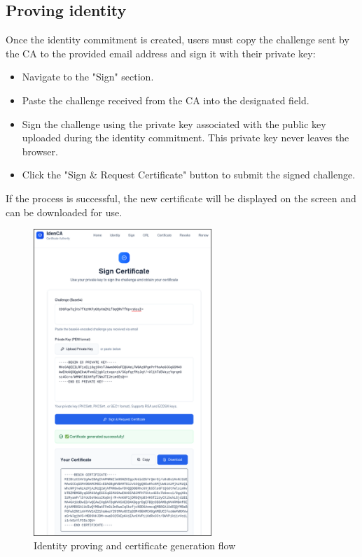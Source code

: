 \subsection{Proving identity}
Once the identity commitment is created, users must copy the challenge sent by the CA to the provided
email address and sign it with their private key:
\begin{itemize}
    \item Navigate to the "Sign" section.
    \item Paste the challenge received from the CA into the designated field.
    \item Sign the challenge using the private key associated with the public key uploaded during 
            the identity commitment. This private key never leaves the browser.
    \item Click the "Sign \& Request Certificate" button to submit the signed challenge.
\end{itemize}
If the process is successful, the new certificate will be displayed on the screen and can be 
downloaded for use.
\begin{figure}[h!]
    \centering
    \includegraphics[keepaspectratio, width=0.6\textwidth]{Pic/4_certificate_generation.png}
    \caption{Identity proving and certificate generation flow}
    \label{fig:certificate-generation}
\end{figure}

